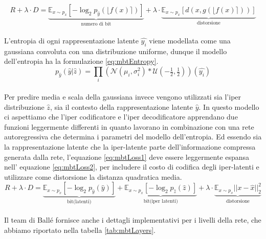 \begin{equation}\label{eq:mbtLoss1}
    R + \lambda \cdot D = \underbrace{\mathbb{E}_{x \sim p_{x}}[-\log_{2} p_{\hat{y}}(\lfloor f(x) \rceil)]}_{\textrm{numero di bit}} + \lambda \cdot \underbrace{\mathbb{E}_{x \sim p_{x}}[d(x,g(\lfloor f(x) \rceil))]}_{\textrm{distorsione}}
\end{equation}\\
L’entropia di ogni rappresentazione latente $\hat{y_{i}}$ viene modellata come una gaussiana convoluta con una distribuzione uniforme, dunque il modello dell’entropia ha la formulazione \ref{eq:mbtEntropy}.
\begin{equation}\label{eq:mbtEntropy}
    p_{\hat{y}}(\hat{y}|\hat{z}) = \prod_{i}(\mathcal{N}(\mu_{i},\sigma_{i}^{2})*\mathcal{U}(-\tfrac{1}{2},\tfrac{1}{2}))(\hat{y_{i}})
\end{equation}\\
Per predire media e scala della gaussiana invece vengono utilizzati sia l’iper distribuzione $\hat{z}$, sia il contesto della rappresentazione latente $\hat{y}$.
In questo modello ci aspettiamo che l’iper codificatore e l’iper decodificatore apprendano due funzioni leggermente differenti in quanto lavorano in combinazione con una rete autoregressiva che determina i parametri del modello dell’entropia. Ed essendo sia la rappresentazione latente che la iper-latente parte dell’informazione compressa generata dalla rete, l’equazione \ref{eq:mbtLoss1} deve essere leggermente espansa nell' equazione \ref{eq:mbtLoss2}, per includere il costo di codifica degli iper-latenti e utilizzare come distorsione la distanza quadratica media.\\
\begin{equation}\label{eq:mbtLoss2}
    R + \lambda \cdot D = \underbrace{\mathbb{E}_{x \sim p_{x}}[-\log_{2} p_{\hat{y}}(\hat{y})]}_{\textrm{bit(latenti)}} + \underbrace{\mathbb{E}_{x \sim p_{x}}[-\log_{2} p_{\hat{z}}(\hat{z})]}_{\textrm{bit(iper latenti)}} + \lambda \cdot \underbrace{\mathbb{E}_{x \sim p_{x}}||x-\hat{x}||_{2}^{2}}_{\textrm{distorsione}}
\end{equation}\\
Il team di Ballé fornisce anche i dettagli implementativi per i livelli della rete, che abbiamo riportato nella tabella \ref{tab:mbtLayers}.
